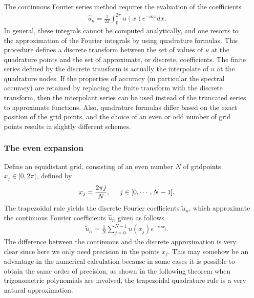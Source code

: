     The continuous Fourier series method requires the evaluation of the coefficients
    \begin{align}
        \hat{u}_n = \displaystyle \frac{1}{2\pi} \int_{0}^{2\pi} u(x) e^{-inx} dx.
    \end{align}
    In general, these integrals cannot be computed analytically, and one resorts to the approximation of the Fourier integrals by using quadrature formulas. This procedure defines a discrete transform between the set of values of $u$ at the quadrature points and the set of approximate, or discrete, coefficients. The finite series defined by the discrete transform is actually the interpolate of $u$ at the quadrature nodes. If the properties of accuracy (in particular the spectral accuracy) are retained by replacing the finite transform with the discrete transform, then the interpolant series can be used instead of the truncated series to approximate functions. Also, quadrature formulas differ based on the exact position of the grid points, and the choice of an even or odd number of grid points results in slightly different schemes.
    
    \subsubsection{The even expansion}
    
    Define an equidistant grid, consisting of an even number $N$ of gridpoints $x_j \in [0, 2\pi)$, defined by
	\begin{align*}
        x_j = \frac{2 \pi j}{N} , \hspace{0.5cm} j\in [0, \cdots , N -1]. 
    \end{align*}
    The trapezoidal rule yields the discrete Fourier coefficients $\widetilde{u}_n$, which approximate the continuous Fourier coefficients $\hat{u}_n$ given as follows    
    \begin{align}
        	\widetilde{u}_n = \frac{1}{N}  \displaystyle \sum_{j = 0}^{N - 1} u(x_j) e^{-in x_j}.
    \end{align}
	The difference between the continuous and the discrete approximation is very clear since here we only need precision in the points $ x_j $. This may somehow be an advantage in the numerical calculation because in some cases it is possible to obtain the same order of precision, as shown in the following theorem when trigonometric polynomials are involved, the trapezoidal quadrature rule is a very natural approximation. \\
	
